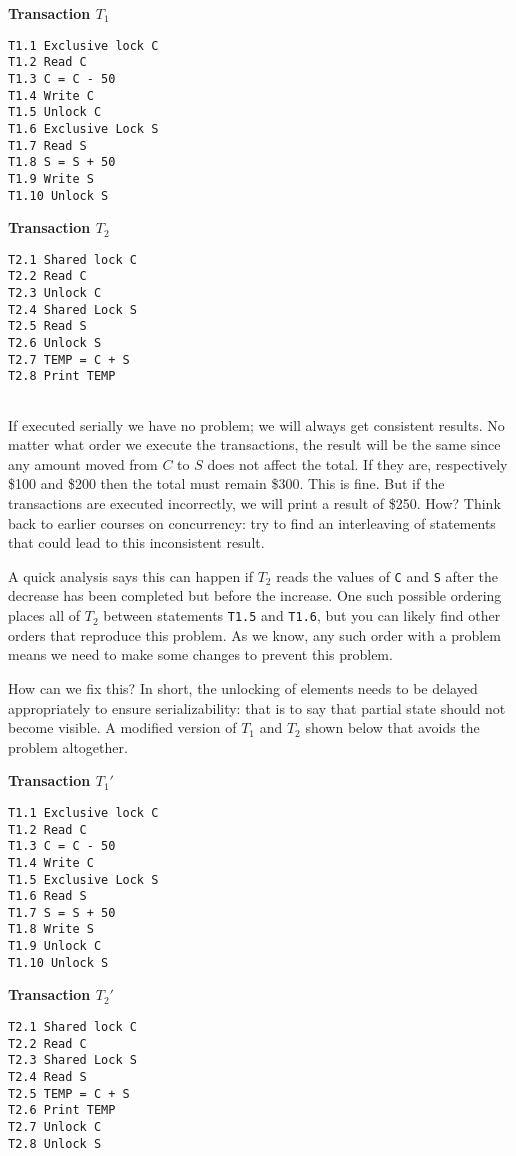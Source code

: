 \begin{multicols}{2}
\textbf{Transaction $T_{1}$}
\begin{verbatim}
T1.1 Exclusive lock C
T1.2 Read C
T1.3 C = C - 50
T1.4 Write C
T1.5 Unlock C
T1.6 Exclusive Lock S
T1.7 Read S
T1.8 S = S + 50
T1.9 Write S
T1.10 Unlock S
\end{verbatim}

\columnbreak
\textbf{Transaction $T_{2}$}
\begin{verbatim}
T2.1 Shared lock C
T2.2 Read C
T2.3 Unlock C
T2.4 Shared Lock S
T2.5 Read S
T2.6 Unlock S
T2.7 TEMP = C + S
T2.8 Print TEMP


\end{verbatim}
\end{multicols}

If executed serially we have no problem; we will always get consistent results. No matter what order we execute the transactions, the result will be the same since any amount moved from $C$ to $S$ does not affect the total. If they are, respectively \$100 and \$200 then the total must remain \$300. This is fine. But if the transactions are executed incorrectly, we will print a result of \$250. How?  Think back to earlier courses on concurrency: try to find an interleaving of statements that could lead to this inconsistent result.

A quick analysis says this can happen if $T_{2}$ reads the values of \texttt{C} and \texttt{S} after the decrease has been completed but before the increase. One such possible ordering places all of $T_{2}$ between statements \texttt{T1.5} and \texttt{T1.6}, but you can likely find other orders that reproduce this problem. As we know, any such order with a problem means we need to make some changes to prevent this problem.

How can we fix this? In short, the unlocking of elements needs to be delayed appropriately to ensure serializability: that is to say that partial state should not become visible. A modified version of $T_{1}$ and $T_{2}$ shown below that avoids the problem altogether.

\begin{multicols}{2}
\textbf{Transaction $T_{1}'$}
\begin{verbatim}
T1.1 Exclusive lock C
T1.2 Read C
T1.3 C = C - 50
T1.4 Write C
T1.5 Exclusive Lock S
T1.6 Read S
T1.7 S = S + 50
T1.8 Write S
T1.9 Unlock C
T1.10 Unlock S
\end{verbatim}

\columnbreak
\textbf{Transaction $T_{2}'$}
\begin{verbatim}
T2.1 Shared lock C
T2.2 Read C
T2.3 Shared Lock S
T2.4 Read S
T2.5 TEMP = C + S
T2.6 Print TEMP
T2.7 Unlock C
T2.8 Unlock S


\end{verbatim}
\end{multicols}

